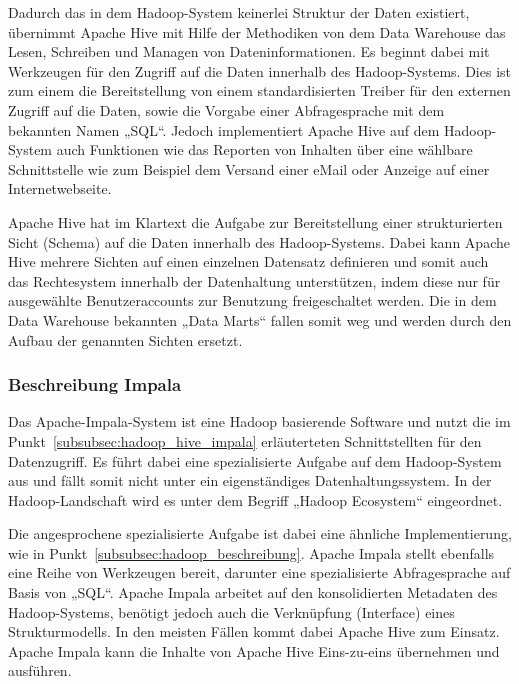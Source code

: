 Dadurch das in dem Hadoop-System keinerlei Struktur der Daten existiert,
übernimmt Apache Hive mit Hilfe der Methodiken von dem Data Warehouse das
Lesen, Schreiben und Managen von Dateninformationen. Es beginnt dabei mit
Werkzeugen für den Zugriff auf die Daten innerhalb des Hadoop-Systems. Dies ist
zum einem die Bereitstellung von einem standardisierten Treiber für den
externen Zugriff auf die Daten, sowie die Vorgabe einer Abfragesprache mit dem
bekannten Namen „SQL“. Jedoch implementiert Apache Hive auf dem Hadoop-System
auch Funktionen wie das Reporten von Inhalten über eine wählbare Schnittstelle
wie zum Beispiel dem Versand einer eMail oder Anzeige auf einer
Internetwebseite.

Apache Hive hat im Klartext die Aufgabe zur Bereitstellung einer strukturierten
Sicht (Schema) auf die Daten innerhalb des Hadoop-Systems. Dabei kann Apache
Hive mehrere Sichten auf einen einzelnen Datensatz definieren und somit auch
das Rechtesystem innerhalb der Datenhaltung unterstützen, indem diese nur
für ausgewählte Benutzeraccounts zur Benutzung freigeschaltet werden. Die in
dem Data Warehouse bekannten „Data Marts“ fallen somit weg und werden durch
den Aufbau der genannten Sichten ersetzt.
\nl%

\subsubsection{Beschreibung Impala}
\label{subsubsec:impala_beschreibung}
Das Apache-Impala-System ist eine Hadoop basierende Software und nutzt die
im Punkt~\ref{subsubsec:hadoop_hive_impala} erläuterteten Schnittstellten
für den Datenzugriff. Es führt dabei eine spezialisierte Aufgabe auf dem
Hadoop-System aus und fällt somit nicht unter ein eigenständiges
Datenhaltungssystem. In der Hadoop-Landschaft wird es unter dem Begriff
„Hadoop Ecosystem“ eingeordnet.

Die angesprochene spezialisierte Aufgabe ist dabei eine ähnliche
Implementierung, wie in Punkt~\ref{subsubsec:hadoop_beschreibung}. Apache
Impala stellt ebenfalls eine Reihe von Werkzeugen bereit, darunter eine
spezialisierte Abfragesprache auf Basis von „SQL“. Apache Impala arbeitet auf
den konsolidierten Metadaten des Hadoop-Systems, benötigt jedoch auch die
Verknüpfung (Interface) eines Strukturmodells. In den meisten Fällen kommt
dabei Apache Hive zum Einsatz. Apache Impala kann die Inhalte von Apache Hive
Eins-zu-eins übernehmen und ausführen.

